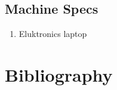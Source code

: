 \documentclass[letterpaper,titlepage]{article}
\begin{document}
\subsection{Machine Specs}
\begin{enumerate}
    \item Eluktronics laptop
\end{enumerate}


\section{Bibliography}

\printbibliography[
heading=bibintoc,
title={Whole bibliography}
] %


\end{document}
